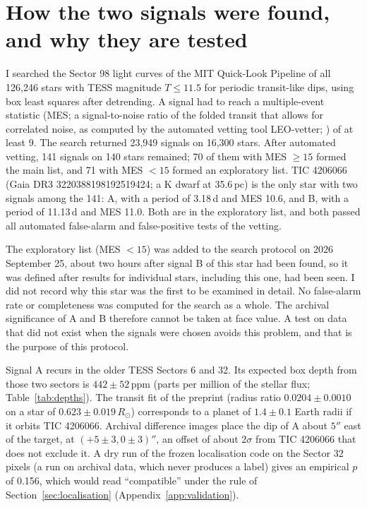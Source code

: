 \section{How the two signals were found, and why they are tested} \label{sec:signals}

 I searched the Sector 98 light curves of the MIT Quick-Look Pipeline \citep[QLP;][]{Huang2020} of
all 126,246 stars with TESS magnitude $T \leq 11.5$ for periodic transit-like dips, using box least squares after
detrending. A signal had to reach a multiple-event statistic (MES; a signal-to-noise ratio of the folded transit that
allows for correlated noise, as computed by the automated vetting tool LEO-vetter; \citealt{Kunimoto2025}) of at least
9. The search returned 23,949 signals on 16,300 stars. After automated vetting, 141 signals on 140 stars remained; 70
of them with MES $\geq 15$ formed the main list, and 71 with MES $< 15$ formed an exploratory list. TIC 4206066 (Gaia
DR3 3220388198192519424; a K dwarf at 35.6\,pc) is the only star with two signals among the 141: A, with a period of
3.18\,d and MES 10.6, and B, with a period of 11.13\,d and MES 11.0. Both are in the exploratory list, and both passed
all automated false-alarm and false-positive tests of the vetting.

 The exploratory list (MES $< 15$) was added to the search protocol on
2026 September 25, about two hours after signal B of this star had been found, so it was defined after results for
individual stars, including this one, had been seen. I did not record why this star was the first to be examined in
detail. No false-alarm rate or completeness was computed for the search as a whole. The archival significance of A
and B therefore cannot be taken at face value. A test on data that did not exist when the signals were chosen avoids
this problem, and that is the purpose of this protocol.

 Signal A recurs in the older TESS Sectors 6 and 32. Its expected box depth from
those two sectors is $442 \pm 52$\,ppm (parts per million of the stellar flux; Table~\ref{tab:depths}). The transit fit of the preprint (radius ratio
$0.0204 \pm 0.0010$ on a star of $0.623 \pm 0.019\,R_\odot$) corresponds to a planet of $1.4 \pm 0.1$ Earth radii if
it orbits TIC 4206066. Archival difference images place the dip of A about $5''$ east of the target, at $(+5 \pm 3, 0
\pm 3)''$, an offset of about $2\sigma$ from TIC 4206066 that does not exclude it. A dry run of the frozen localisation code on the
Sector 32 pixels (a run on archival data, which never produces a label) gives an empirical $p$ of 0.156, which would
read ``compatible'' under the rule of Section~\ref{sec:localisation} (Appendix~\ref{app:validation}).

